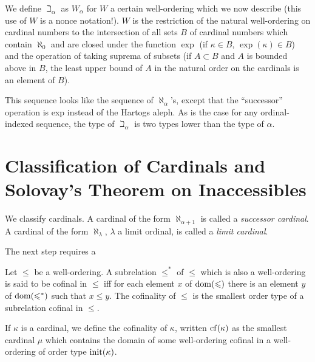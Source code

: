 \begin{definition}
 We define $\beth_{\alpha}$ as $W_{\alpha}$ for $W$
 a certain well-ordering which we now describe (this use
 of $W$ is a nonce notation!).  $W$ is the restriction of the natural
 well-ordering on cardinal numbers to the
 intersection of all sets $B$ of cardinal 
 numbers which contain $\aleph_0$ and are closed under the function $\exp$ (if $\kappa
 \in B$, 
 $\exp(\kappa) \in B$) and the operation of taking suprema of
 subsets (if $A \subset B$ and $A$ is bounded above in $B$, the
 least upper bound of $A$ in the natural order on the cardinals is an element
 of $B$).
\end{definition}

This sequence looks like the sequence of
$\aleph_{\alpha}$'s, except that the ``successor''
operation is exp instead of the Hartogs aleph. 
As is the case for any ordinal-indexed sequence, the type of $\beth_{\alpha}$ is two types lower than the type of $\alpha$.



\section[Solovay's Theorem]{Classification of Cardinals and Solovay's Theorem
on Inaccessibles} 

We classify cardinals.  A cardinal of the form $\aleph_{\alpha+1}$ is
called a {\itshape successor cardinal\/}.  A cardinal of the form $\aleph_{\lambda}$, $\lambda$ a limit
ordinal, is called a {\itshape limit
cardinal\/}.

The next step requires a 

\begin{definition}
 Let $\leq$ be a well-ordering.  A subrelation
 $\leq^*$ of $\leq$ which is also a well-ordering is said to be {\upshape
 cofinal} in $\leq$ iff for each element $x$ of $\mathop{\mathrm{dom}}(\leqslant)$ there is
 an element $y$ of $\mathop{\mathrm{dom}}(\leqslant^*)$ such that $x \leq y$.  The {\upshape
 cofinality} of $\leq$ is the smallest order
 type of a subrelation cofinal in $\leq$.

 If $\kappa$ is a cardinal, we define the {\upshape
 cofinality} of $\kappa$, written $\mathop{\mathrm{cf}}(\kappa)$ as the smallest
 cardinal $\mu$ which contains the domain of some well-ordering cofinal in
 a well-ordering of order type $\mathop{\mathrm{init}}(\kappa)$.
\end{definition}


